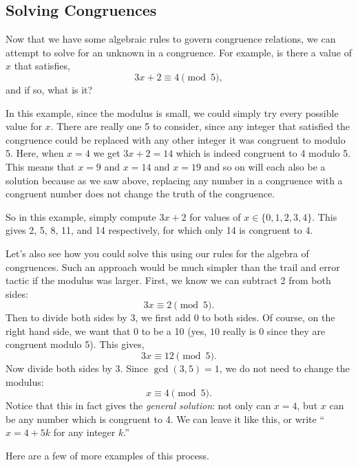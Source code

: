 \documentclass[12pt]{article}
\begin{document}
\subsection{Solving Congruences}


Now that we have some algebraic rules to govern congruence relations, we can attempt to solve for an unknown in a congruence.  For example, is there a value of $x$ that satisfies,
\[3x + 2 \equiv 4 \pmod{5},\]
and if so, what is it?

In this example, since the modulus is small, we could simply try every possible value for $x$.  There are really one 5 to consider, since any integer that satisfied the congruence could be replaced with any other integer it was congruent to modulo 5.  Here, when $x = 4$ we get $3x + 2 = 14$ which is indeed congruent to 4 modulo 5.  This means that $x = 9$  and $x = 14$ and $x = 19$ and so on will each also be a solution because as we saw above, replacing any number in a congruence with a congruent number does not change the truth of the congruence.

So in this example, simply compute $3x + 2$ for values of $x \in \{0,1,2,3,4\}$.  This gives 2, 5, 8, 11, and 14 respectively, for which only 14 is congruent to 4.  

Let's also see how you could solve this using our rules for the algebra of congruences.  Such an approach would be much simpler than the trail and error tactic if the modulus was larger.  First, we know we can subtract 2 from both sides:
\[3x \equiv 2 \pmod{5}.\]
Then to divide both sides by 3, we first add 0 to both sides.  Of course, on the right hand side, we want that 0 to be a 10 (yes, $10$ really is 0 since they are congruent modulo 5).  This gives,
\[3x \equiv 12 \pmod{5}.\]
Now divide both sides by 3.  Since $\gcd(3,5) = 1$, we do not need to change the modulus:
\[x \equiv 4 \pmod{5}.\]
Notice that this in fact gives the {\em general solution}: not only can $x = 4$, but $x$ can be any number which is congruent to 4.   We can leave it like this, or write ``$x = 4 + 5k$ for any integer $k$.''

Here are a few of more examples of this process.
\end{document}

